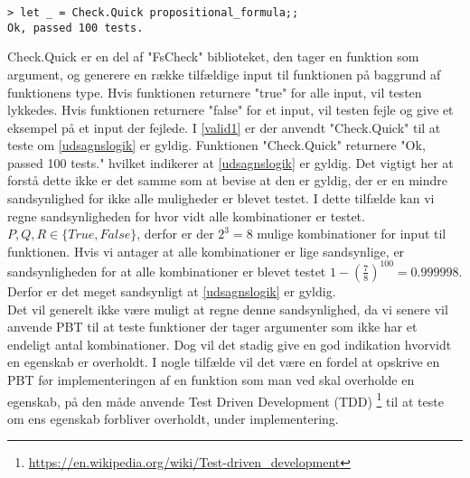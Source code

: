 \begin{lstlisting}[style=output, label={lst:output_example}, caption={Output ved PBT af \ref{udsagnslogik}}]
> let _ = Check.Quick propositional_formula;;
Ok, passed 100 tests.
\end{lstlisting}

Check.Quick er en del af "FsCheck" biblioteket, den tager en funktion som argument, og generere en række tilfældige input til funktionen på baggrund af funktionens type. Hvis funktionen returnere "true" for alle input, vil testen lykkedes. Hvis funktionen returnere "false" for et input, vil testen fejle og give et eksempel på et input der fejlede. I \ref{valid1} er der anvendt "Check.Quick" til at teste om \ref{udsagnslogik} er gyldig. Funktionen "Check.Quick" returnere "Ok, passed 100 tests." hvilket indikerer at \ref{udsagnslogik} er gyldig. Det vigtigt her at forstå dette ikke er det samme som at bevise at den er gyldig, der er en mindre sandsynlighed for ikke alle muligheder er blevet testet. I dette tilfælde kan vi regne sandsynligheden for hvor vidt alle kombinationer er testet. $P, Q, R \in \{True, False\}$, derfor er der $2^3 = 8$ mulige kombinationer for input til funktionen. Hvis vi antager at alle kombinationer er lige sandsynlige, er sandsynligheden for at alle kombinationer er blevet testet $1 - (\frac{7}{8})^{100} = 0.999998$. Derfor er det meget sandsynligt at \ref{udsagnslogik} er gyldig.\\
Det vil generelt ikke være muligt at regne denne sandsynlighed, da vi senere vil anvende PBT til at teste funktioner der tager argumenter som ikke har et endeligt antal kombinationer. Dog vil det stadig give en god indikation hvorvidt en egenskab er overholdt. I nogle tilfælde vil det være en fordel at opskrive en PBT før implementeringen af en funktion som man ved skal overholde en egenskab, på den måde anvende Test Driven Development (TDD) \footnote{\url{https://en.wikipedia.org/wiki/Test-driven_development}} til at teste om ens egenskab forbliver overholdt, under implementering.
